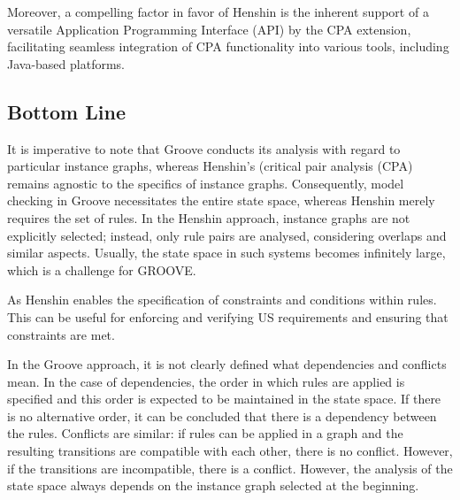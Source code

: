 Moreover, a compelling factor in favor of Henshin is the inherent support of a versatile Application Programming Interface (API) by the CPA extension, facilitating seamless integration of CPA functionality into various tools, including Java-based platforms.

\subsection{Bottom Line}\label{henshin_groove_conclusion}
It is imperative to note that Groove conducts its analysis with regard to particular instance graphs, whereas Henshin's (critical pair analysis (CPA) remains agnostic to the specifics of instance graphs. Consequently, model checking in Groove necessitates the entire state space, whereas Henshin merely requires the set of rules. In the Henshin approach, instance graphs are not explicitly selected; instead, only rule pairs are analysed, considering overlaps and similar aspects. Usually, the state space in such systems becomes infinitely large, which is a challenge for GROOVE.

As Henshin enables the specification of constraints and conditions within rules. This can be useful for enforcing and verifying US requirements and ensuring that constraints are met.

In the Groove approach, it is not clearly defined what dependencies and conflicts mean. In the case of dependencies, the order in which rules are applied is specified and this order is expected to be maintained in the state space. If there is no alternative order, it can be concluded that there is a dependency between the rules. Conflicts are similar: if rules can be applied in a graph and the resulting transitions are compatible with each other, there is no conflict. However, if the transitions are incompatible, there is a conflict. However, the analysis of the state space always depends on the instance graph selected at the beginning.
